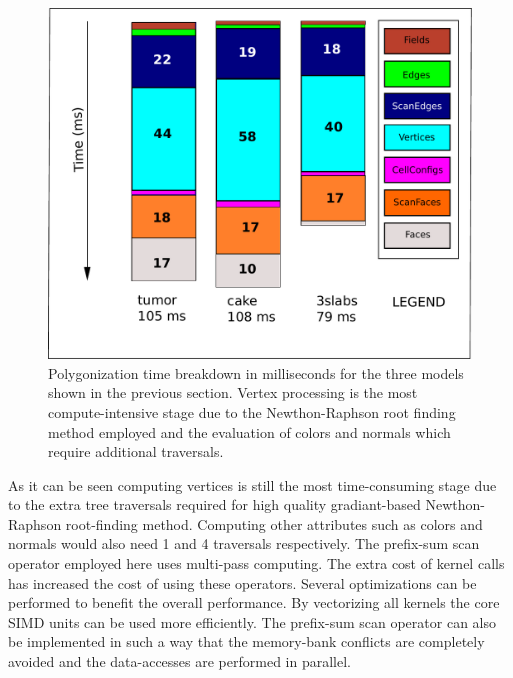 
\begin{figure}[H]
  \centering
  \includegraphics[width=0.8\linewidth]{figures/gpupoly/breakdownpoly.pdf}
  \caption{\label{fig:breakdownpoly}
  {Polygonization time breakdown in milliseconds for the three models shown in the previous section. Vertex processing is the most compute-intensive
  stage due to the Newthon-Raphson root finding method employed and the evaluation of colors and normals which require additional traversals.
  }
}
\end{figure}

As it can be seen computing vertices is still the most time-consuming stage due to the extra tree traversals required for high quality 
gradiant-based Newthon-Raphson root-finding method. Computing other attributes such as colors and normals would also need 1 and 4 
traversals respectively. The prefix-sum scan operator employed here uses multi-pass computing. The extra cost of kernel calls has
increased the cost of using these operators. Several optimizations can be performed to benefit the overall performance. By 
vectorizing all kernels the core SIMD units can be used more efficiently. The prefix-sum scan operator can also be implemented in such a way 
that the memory-bank conflicts are completely avoided and the data-accesses are performed in parallel.






















